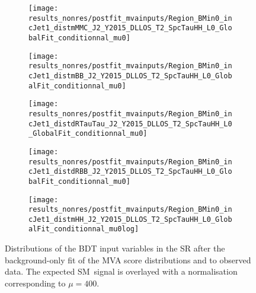 \begin{figure}[htbp]
  \centering

  \begin{subfigure}{0.46\textwidth}
    \texttt{[image: results\_nonres/postfit\_mvainputs/Region\_BMin0\_incJet1\_distmMMC\_J2\_Y2015\_DLLOS\_T2\_SpcTauHH\_L0\_GlobalFit\_conditionnal\_mu0]}
  \end{subfigure}\hfill%
  \begin{subfigure}{0.46\textwidth}
    \texttt{[image: results\_nonres/postfit\_mvainputs/Region\_BMin0\_incJet1\_distmBB\_J2\_Y2015\_DLLOS\_T2\_SpcTauHH\_L0\_GlobalFit\_conditionnal\_mu0]}
  \end{subfigure}

  \begin{subfigure}{0.46\textwidth}
    \texttt{[image: results\_nonres/postfit\_mvainputs/Region\_BMin0\_incJet1\_distdRTauTau\_J2\_Y2015\_DLLOS\_T2\_SpcTauHH\_L0\_GlobalFit\_conditionnal\_mu0]}
  \end{subfigure}\hfill%
  \begin{subfigure}{0.46\textwidth}
    \texttt{[image: results\_nonres/postfit\_mvainputs/Region\_BMin0\_incJet1\_distdRBB\_J2\_Y2015\_DLLOS\_T2\_SpcTauHH\_L0\_GlobalFit\_conditionnal\_mu0]}
  \end{subfigure}

  \begin{subfigure}{0.46\textwidth}
    \texttt{[image: results\_nonres/postfit\_mvainputs/Region\_BMin0\_incJet1\_distmHH\_J2\_Y2015\_DLLOS\_T2\_SpcTauHH\_L0\_GlobalFit\_conditionnal\_mu0log]}
  \end{subfigure}

  \caption{Distributions of the BDT input variables in the \hadhad SR after the
    background-only fit of the MVA score distributions and \mll to observed
    data. The expected SM~\HH signal is overlayed with a normalisation
    corresponding to $\mu = 400$.}%
  \label{fig:postfit_mva_inputs}
\end{figure}


